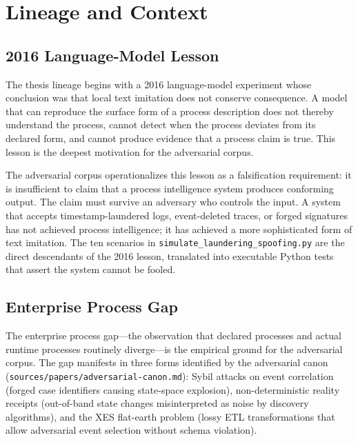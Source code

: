 
\section{Lineage and Context}
\label{sec:adversarial-lineage}

\subsection{2016 Language-Model Lesson}
\label{sec:adversarial-lineage-2016}

The thesis lineage begins with a 2016 language-model experiment whose conclusion was that local
text imitation does not conserve consequence. A model that can reproduce the surface form of a
process description does not thereby understand the process, cannot detect when the process
deviates from its declared form, and cannot produce evidence that a process claim is true. This
lesson is the deepest motivation for the adversarial corpus.

The adversarial corpus operationalizes this lesson as a falsification requirement: it is
insufficient to claim that a process intelligence system produces conforming output. The claim
must survive an adversary who controls the input. A system that accepts timestamp-laundered
logs, event-deleted traces, or forged signatures has not achieved process intelligence; it has
achieved a more sophisticated form of text imitation. The ten scenarios in
\texttt{simulate\_laundering\_spoofing.py} are the direct descendants of the 2016 lesson,
translated into executable Python tests that assert the system cannot be fooled.

\subsection{Enterprise Process Gap}
\label{sec:adversarial-lineage-enterprise}

The enterprise process gap---the observation that declared processes and actual runtime
processes routinely diverge---is the empirical ground for the adversarial corpus. The gap
manifests in three forms identified by the adversarial canon
(\texttt{sources/papers/adversarial-canon.md}): Sybil attacks on event correlation (forged
case identifiers causing state-space explosion), non-deterministic reality receipts
(out-of-band state changes misinterpreted as noise by discovery algorithms), and the XES
flat-earth problem (lossy ETL transformations that allow adversarial event selection without
schema violation).

